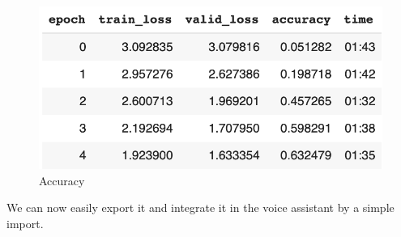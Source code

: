 \documentclass[conference]{IEEEtran}
\begin{document}
\begin{figure}[H]
    \begin{center}
        \includegraphics[width=\columnwidth]{Accuracy.png}
    \end{center}
    \caption{Accuracy}
    \label{fig:accuracy}
\end{figure}
We can now easily export it and integrate it in the voice assistant by a simple import.
\end{document}
